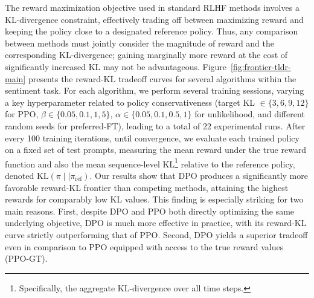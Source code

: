 The reward maximization objective used in standard RLHF methods involves a KL-divergence constraint, effectively trading off between maximizing reward and keeping the policy close to a designated reference policy. Thus, any comparison between methods must jointly consider the magnitude of reward and the corresponding KL-divergence; gaining marginally more reward at the cost of significantly increased KL may not be advantageous. Figure~\ref{fig:frontier-tldr-main} presents the reward-KL tradeoff curves for several algorithms within the sentiment task. For each algorithm, we perform several training sessions, varying a key hyperparameter related to policy conservativeness (target KL $\in\{3,6,9,12\}$ for PPO, $\beta \in \{0.05,0.1,1,5\}$, $\alpha\in\{0.05,0.1,0.5,1\}$ for unlikelihood, and different random seeds for preferred-FT), leading to a total of 22 experimental runs. After every 100 training iterations, until convergence, we evaluate each trained policy on a fixed set of test prompts, measuring the mean reward under the true reward function and also the mean sequence-level KL\footnote{Specifically, the aggregate KL-divergence over all time steps.} relative to the reference policy, denoted $\text{KL}\left(\pi\mid \mid \pi_\text{ref}\right)$. Our results show that DPO produces a significantly more favorable reward-KL frontier than competing methods, attaining the highest rewards for comparably low KL values. This finding is especially striking for two main reasons. First, despite DPO and PPO both directly optimizing the same underlying objective, DPO is much more effective in practice, with its reward-KL curve strictly outperforming that of PPO. Second, DPO yields a superior tradeoff even in comparison to PPO equipped with access to the true reward values (PPO-GT).

